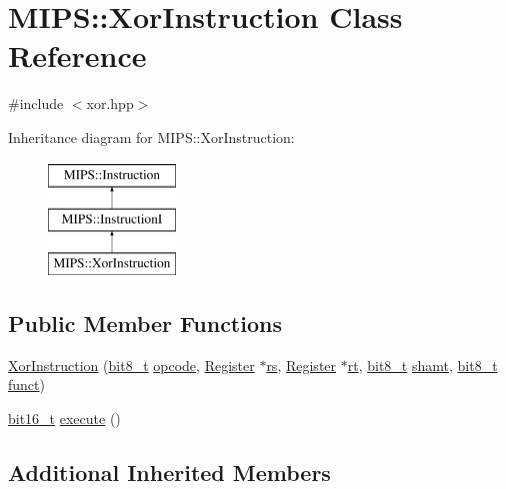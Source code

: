 \hypertarget{classMIPS_1_1XorInstruction}{}\section{M\+I\+PS\+:\+:Xor\+Instruction Class Reference}
\label{classMIPS_1_1XorInstruction}


{\ttfamily \#include $<$xor.\+hpp$>$}

Inheritance diagram for M\+I\+PS\+:\+:Xor\+Instruction\+:\begin{figure}[H]
\begin{center}
\leavevmode
\includegraphics[height=3.000000cm]{classMIPS_1_1XorInstruction}
\end{center}
\end{figure}
\subsection*{Public Member Functions}
\begin{DoxyCompactItemize}
\item 
\hyperlink{classMIPS_1_1XorInstruction_ac6b0e810912319f45b0e42b80d9b0f9e}{Xor\+Instruction} (\hyperlink{core_8hpp_a6074bae122ae7b527864eec42c728c3c}{bit8\+\_\+t} \hyperlink{classMIPS_1_1Instruction_a45cc6808b5dde8a5d41067d148b55476}{opcode}, \hyperlink{classMIPS_1_1Register}{Register} $\ast$\hyperlink{classMIPS_1_1InstructionI_a2be191d5b3dce505e2e626ec02eb4d62}{rs}, \hyperlink{classMIPS_1_1Register}{Register} $\ast$\hyperlink{classMIPS_1_1InstructionI_add1db07a5c954f35271de8c8a5737487}{rt}, \hyperlink{core_8hpp_a6074bae122ae7b527864eec42c728c3c}{bit8\+\_\+t} \hyperlink{classMIPS_1_1InstructionI_aa9b6da37c374c2ec8d96448d341e5e7d}{shamt}, \hyperlink{core_8hpp_a6074bae122ae7b527864eec42c728c3c}{bit8\+\_\+t} \hyperlink{classMIPS_1_1InstructionI_a5c6efcbbd233a7447c1fe24ea0a1e558}{funct})
\item 
\hyperlink{core_8hpp_adc265a970bc35995b5879784bbb3f1b7}{bit16\+\_\+t} \hyperlink{classMIPS_1_1XorInstruction_aaebc7dc8723627871ba2caf85f01fbea}{execute} ()
\end{DoxyCompactItemize}
\subsection*{Additional Inherited Members}


